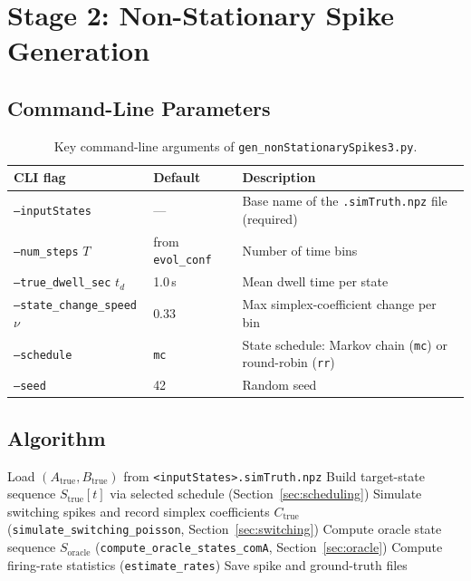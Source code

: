 \documentclass[11pt]{article}
\begin{document}
\section{Stage 2: Non-Stationary Spike Generation}
\label{sec:nonstat_spikes}

\subsection{Command-Line Parameters}

\begin{table}[htbp]
\centering
\begin{tabular}{lll}
\toprule
CLI flag & Default & Description \\
\midrule
\texttt{--inputStates} & --- &
  Base name of the \texttt{.simTruth.npz} file (required) \\
\texttt{--num\_steps} $T$ & from \texttt{evol\_conf} &
  Number of time bins \\
\texttt{--true\_dwell\_sec} $t_d$ & 1.0\,s &
  Mean dwell time per state \\
\texttt{--state\_change\_speed} $\nu$ & 0.33 &
  Max simplex-coefficient change per bin \\
\texttt{--schedule} & \texttt{mc} &
  State schedule: Markov chain (\texttt{mc}) or round-robin (\texttt{rr}) \\
\texttt{--seed} & 42 & Random seed \\
\bottomrule
\end{tabular}
\caption{Key command-line arguments of \texttt{gen\_nonStationarySpikes3.py}.}
\label{tab:nonstat_args}
\end{table}

\subsection{Algorithm}

\begin{algorithm}[H]
\caption{Non-Stationary Spike Generation
  (\texttt{gen\_nonStationarySpikes3.py})}
\begin{algorithmic}[1]
\STATE Load $(A_{\text{true}}, B_{\text{true}})$ from
       \texttt{<inputStates>.simTruth.npz}
\STATE Build target-state sequence $S_{\text{true}}[t]$
       via selected schedule (Section~\ref{sec:scheduling})
\STATE Simulate switching spikes and record simplex coefficients $C_{\text{true}}$
       (\texttt{simulate\_switching\_poisson}, Section~\ref{sec:switching})
\STATE Compute oracle state sequence $S_{\text{oracle}}$
       (\texttt{compute\_oracle\_states\_comA}, Section~\ref{sec:oracle})
\STATE Compute firing-rate statistics (\texttt{estimate\_rates})
\STATE Save spike and ground-truth files
\end{algorithmic}
\end{algorithm}
\end{document}
